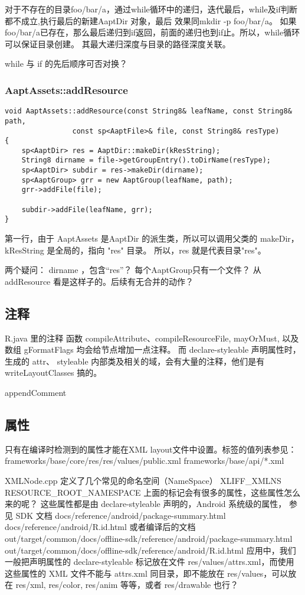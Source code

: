 \documentclass[a4paper,11pt]{article}
\begin{document}
对于不存在的目录foo/bar/a，通过while循环中的递归，迭代最后，while及if判断都不成立,执行最后的新建AaptDir 对象，最后
效果同mkdir -p foo/bar/a。 如果 foo/bar/a已存在，那么最后递归到if返回，前面的递归也到if止。所以，while循环可以保证目录创建。
其最大递归深度与目录的路径深度关联。

while 与 if 的先后顺序可否对换？
\subsubsection{AaptAssets::addResource}\label{aaptassetsaddres}
\begin{lstlisting}
void AaptAssets::addResource(const String8& leafName, const String8& path,
                const sp<AaptFile>& file, const String8& resType)
{
    sp<AaptDir> res = AaptDir::makeDir(kResString);
    String8 dirname = file->getGroupEntry().toDirName(resType);
    sp<AaptDir> subdir = res->makeDir(dirname);
    sp<AaptGroup> grr = new AaptGroup(leafName, path);
    grr->addFile(file);

    subdir->addFile(leafName, grr); 
}
\end{lstlisting}
 第一行，由于 AaptAssets 是AaptDir 的派生类，所以可以调用父类的 makeDir，
kResString 是全局的，指向 "res" 目录。
所以，res 就是代表目录"res"。 

两个疑问： dirname ，包含“res”？
每个AaptGroup只有一个文件？ 从addResource 看是这样子的。后续有无合并的动作？

\subsection{注释}
R.java 里的注释
函数 compileAttribute、compileResourceFile, mayOrMust, 以及数组 gFormatFlags
均会给节点增加一点注释。 而 declare-styleable 声明属性时，生成的 attr、
styleable 内部类及相关的域，会有大量的注释，他们是有 writeLayoutClasses 搞的。

appendComment

\subsection{属性}
只有在编译时检测到的属性才能在XML layout文件中设置。标签的值列表参见：
frameworks/base/core/res/res/values/public.xml
frameworks/base/api/*.xml 

XMLNode.cpp 定义了几个常见的命名空间（NameSpace） 
XLIFF_XMLNS      RESOURCE_ROOT_NAMESPACE  
上面的标记会有很多的属性，这些属性怎么来的呢？ 这些属性都是由
declare-styleable 声明的，Android 系统级的属性，
参见 SDK 文档
docs/reference/android/package-summary.html
docs/reference/android/R.id.html
或者编译后的文档
out/target/common/docs/offline-sdk/reference/android/package-summary.html
out/target/common/docs/offline-sdk/reference/android/R.id.html
应用中，我们一般把声明属性的 declare-styleable 标记放在文件
res/values/attrs.xml，而使用这些属性的 XML 文件不能与 attrs.xml
同目录，即不能放在 res/values，可以放在 res/xml, res/color, res/anim 等等，或者
res/drawable 也行？
\end{document}
